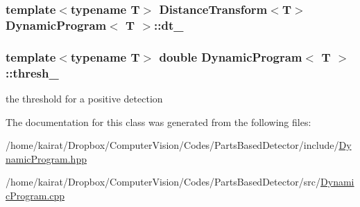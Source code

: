 \subsubsection[{dt\+\_\+}]{\setlength{\rightskip}{0pt plus 5cm}template$<$typename T$>$ {\bf Distance\+Transform}$<$T$>$ {\bf Dynamic\+Program}$<$ T $>$\+::dt\+\_\+\hspace{0.3cm}{\ttfamily [private]}}\label{classDynamicProgram_a6cea0b8559d6a03d81e2003991ab67cf}
\hypertarget{classDynamicProgram_a08f2d4801faa0f964e217b9ac9927ec6}{}
\subsubsection[{thresh\+\_\+}]{\setlength{\rightskip}{0pt plus 5cm}template$<$typename T$>$ double {\bf Dynamic\+Program}$<$ T $>$\+::thresh\+\_\+\hspace{0.3cm}{\ttfamily [private]}}\label{classDynamicProgram_a08f2d4801faa0f964e217b9ac9927ec6}


the threshold for a positive detection 



The documentation for this class was generated from the following files\+:\begin{DoxyCompactItemize}
\item 
/home/kairat/\+Dropbox/\+Computer\+Vision/\+Codes/\+Parts\+Based\+Detector/include/\hyperlink{DynamicProgram_8hpp}{Dynamic\+Program.\+hpp}\item 
/home/kairat/\+Dropbox/\+Computer\+Vision/\+Codes/\+Parts\+Based\+Detector/src/\hyperlink{DynamicProgram_8cpp}{Dynamic\+Program.\+cpp}\end{DoxyCompactItemize}
